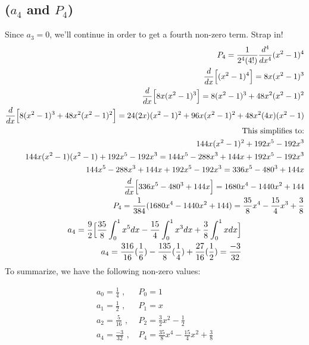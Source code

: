 \documentclass{article}
\begin{document}
\subsection*{\textbf{($a_4$ and $P_4$)}}
Since $a_3=0$, we'll continue in order to get a fourth non-zero term. Strap in!
\begin{equation}
\begin{aligned}
P_4 = \frac{1}{2^4(4!)}\frac{d^4}{dx^4}(x^2-1)^4\\
\frac{d}{dx}\Big{[}(x^2-1)^4 \Big{]} = 8x(x^2-1)^3\\
\frac{d}{dx} \Big{[} 8x(x^2-1)^3 \Big{]}= 8(x^2-1)^3+48x^2(x^2-1)^2\\
\frac{d}{dx} \Big{[} 8(x^2-1)^3+48x^2(x^2-1)^2 \Big{]}= 24(2x)(x^2-1)^2 + 96x(x^2-1)^2 + 48x^2(4x)(x^2-1)\\
\text{This simplifies to:}\\
144x(x^2-1)^2+192x^5-192x^3\\
144x(x^2-1)(x^2-1)+192x^5-192x^3 = 144x^5-288x^3+144x+192x^5-192x^3\\
144x^5-288x^3+144x+192x^5-192x^3 = 336x^5 - 480^3 + 144x\\
\frac{d}{dx}\Big{[}336x^5 - 480^3 + 144x \Big{]} =1680x^4 - 1440x^2+144\\
P_4 = \frac{1}{384}(1680x^4 - 1440x^2+144) = \frac{35}{8}x^4 - \frac{15}{4}x^3+\frac{3}{8}
\end{aligned}
\end{equation}
\begin{equation}
\begin{aligned}
a_4 = \frac{9}{2} \Big{[} \frac{35}{8}\int_0^1x^5dx - \frac{15}{4}\int_0^1x^3dx +\frac{3}{8}\int_0^1xdx \Big{]}\\
a_4 =\frac{316}{16}(\frac{1}{6}) - \frac{135}{8}(\frac{1}{4}) + \frac{27}{16}(\frac{1}{2}) = \frac{-3}{32}
\end{aligned}
\end{equation}
To summarize, we have the following non-zero values:
\begin{tcolorbox}[minipage,colback=white,arc=0pt,outer arc=0pt]
\begin{equation}
\begin{aligned}
a_0 = \frac{1}{4}\text{ , } & P_0 = 1\\
a_1 = \frac{1}{2}\text{ , } & P_1 = x\\
a_2 = \frac{5}{16}\text{ , } & P_2 = \frac{3}{2}x^2-\frac{1}{2}\\
a_4 = \frac{-3}{32}\text{ , } & P_4 = \frac{35}{8}x^4 - \frac{15}{4}x^2 +\frac{3}{8}\\
\end{aligned}
\end{equation}
\end{tcolorbox}
\end{document}
